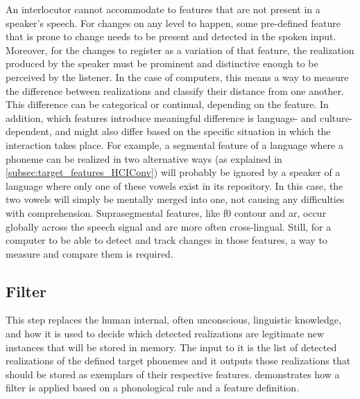 An interlocutor cannot accommodate to features that are not present in a speaker's speech.
For changes on any level to happen, some pre-defined feature that is prone to change needs to be present and detected in the spoken input.
Moreover, for the changes to register as a variation of that feature, the realization produced by the speaker must be prominent and distinctive enough to be perceived by the listener.
In the case of computers, this means a way to measure the difference between realizations and classify their distance from one another.
This difference can be categorical or continual, depending on the feature.
In addition, which features introduce meaningful difference is language- and culture-dependent, and might also differ based on the specific situation in which the interaction takes place.
For example, a segmental feature of a language where a phoneme can be realized in two alternative ways (as explained in \cref{subsec:target_features_HCIConv}) will probably be ignored by a speaker of a language where only one of these vowels exist in its repository.
In this case, the two vowels will simply be mentally merged into one, not causing any difficulties with comprehension.
Suprasegmental features, like \ac{f0} contour and \ac{ar}, occur globally across the speech signal and are more often cross-lingual.
Still, for a computer to be able to detect and track changes in those features, a way to measure and compare them is required.

\subsection{Filter}
\label{subsec:filter}

This step replaces the human internal, often unconscious, linguistic knowledge, and how it is used to decide which detected realizations are legitimate new instances that will be stored in memory.
The input to it is the list of detected realizations of the defined target phonemes and it outputs those realizations that should be stored as exemplars of their respective features.
 demonstrates how a filter is applied based on a phonological rule and a feature definition.

